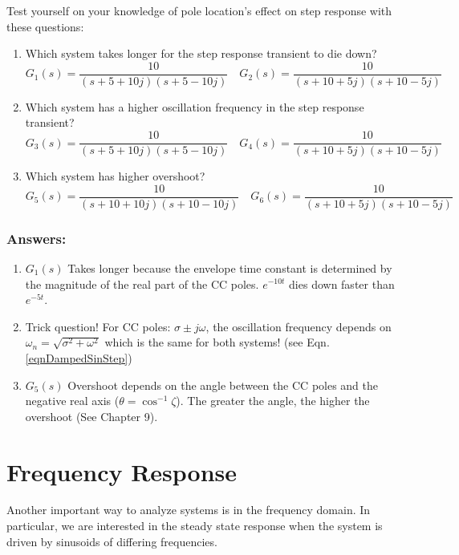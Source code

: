 \begin{Example}
  Test yourself on your knowledge of pole location's effect on step response with these questions:
  \begin{enumerate}
    \item  Which system takes longer for the step response transient to die down?
    \[
    G_1(s) = \frac{10}{(s+5+10j)(s+5-10j)} \quad G_2(s) = \frac{10}{(s+10+5j)(s+10-5j)}
    \]
    \item  Which system has a higher oscillation frequency in the step response transient?
    \[
    G_3(s) = \frac{10}{(s+5+10j)(s+5-10j)} \quad G_4(s) = \frac{10}{(s+10+5j)(s+10-5j)}
    \]

    \item Which system has higher overshoot?
    \[
    G_5(s) = \frac{10}{(s+10+10j)(s+10-10j)} \quad G_6(s) = \frac{10}{(s+10+5j)(s+10-5j)}
    \]
  \end{enumerate}


  \subsubsection*{Answers:}
  \begin{enumerate}
    \item $G_1(s)$  Takes longer because the envelope time constant is determined by the magnitude of
    the real part of the CC poles.   $e^{-10t}$ dies down faster than $e^{-5t}$.

    \item Trick question!   For CC poles: $\sigma \pm j\omega$, the oscillation frequency depends on $\omega_n = \sqrt{\sigma^2+\omega^2}$
    which is the same for both systems! (see Eqn. \ref{eqnDampedSinStep})

    \item $G_5(s)$ Overshoot depends on the angle between the CC poles and the negative real axis ($\theta = \cos^{-1}{\zeta}$).
    The greater the angle, the higher the overshoot (See Chapter 9).
  \end{enumerate}
\end{Example}


\section{Frequency Response}\label{FrequencyResponseSection}

Another important way to analyze systems is in the frequency domain.   In particular, we are interested in the steady state response when the system is driven by  sinusoids of differing frequencies.

